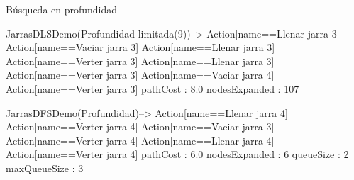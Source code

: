 \documentclass[11pt, a4paper, spanish, openright, twoside]{book}
\begin{document}
\begin{section}{Búsqueda en profundidad}

JarrasDLSDemo(Profundidad limitada(9))-->
Action[name==Llenar jarra 3]
Action[name==Vaciar jarra 3]
Action[name==Llenar jarra 3]
Action[name==Verter jarra 3]
Action[name==Llenar jarra 3]
Action[name==Verter jarra 3]
Action[name==Vaciar jarra 4]
Action[name==Verter jarra 3]
pathCost : 8.0
nodesExpanded : 107

JarrasDFSDemo(Profundidad)-->
Action[name==Llenar jarra 4]
Action[name==Verter jarra 4]
Action[name==Vaciar jarra 3]
Action[name==Verter jarra 4]
Action[name==Llenar jarra 4]
Action[name==Verter jarra 4]
pathCost : 6.0
nodesExpanded : 6
queueSize : 2
maxQueueSize : 3


\end{section}
\end{document}
